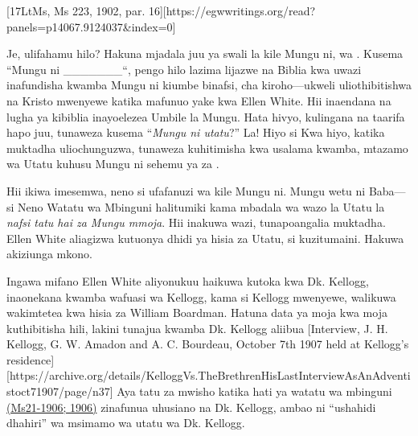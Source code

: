 [17LtMs, Ms 223, 1902, par. 16][https://egwwritings.org/read?panels=p14067.9124037&index=0]

Je, ulifahamu hilo? Hakuna mjadala juu ya swali la kile Mungu ni,  wa . Kusema “Mungu ni \_\_\_\_\_\_\_“, pengo hilo lazima lijazwe na  Biblia kwa uwazi inafundisha kwamba Mungu ni kiumbe binafsi, cha kiroho—ukweli uliothibitishwa na Kristo mwenyewe katika mafunuo yake kwa Ellen White. Hii inaendana na lugha ya kibiblia inayoelezea Umbile la Mungu. Hata hivyo, kulingana na taarifa hapo juu, tunaweza kusema “\textit{Mungu ni utatu}?” La! Hiyo si  Kwa hiyo, katika muktadha uliochunguzwa, tunaweza kuhitimisha kwa usalama kwamba, mtazamo wa Utatu kuhusu Mungu ni sehemu ya  za .

Hii ikiwa imesemwa, neno  si ufafanuzi wa kile Mungu ni. Mungu wetu ni Baba—si  Neno Watatu wa Mbinguni halitumiki kama mbadala wa wazo la Utatu la \textit{nafsi tatu hai za Mungu mmoja}. Hii inakuwa wazi, tunapoangalia muktadha. Ellen White aliagizwa kutuonya dhidi ya hisia za Utatu, si kuzitumaini. Hakuwa akiziunga mkono.

Ingawa mifano Ellen White aliyonukuu haikuwa kutoka kwa Dk. Kellogg, inaonekana kwamba wafuasi wa Kellogg, kama si Kellogg mwenyewe, walikuwa wakimtetea kwa hisia za William Boardman. Hatuna data ya moja kwa moja kuthibitisha hili, lakini tunajua kwamba Dk. Kellogg aliibua [Interview, J. H. Kellogg, G. W. Amadon and A. C. Bourdeau, October 7th 1907 held at Kellogg's residence][https://archive.org/details/KelloggVs.TheBrethrenHisLastInterviewAsAnAdventistoct71907/page/n37] Aya tatu za mwisho katika hati ya watatu wa mbinguni \href{https://egwwritings.org/?ref=en_Ms21-1906&para=9754.1}{(Ms21-1906; 1906)} zinafunua uhusiano na Dk. Kellogg, ambao ni “ushahidi dhahiri” wa msimamo wa utatu wa Dk. Kellogg.

